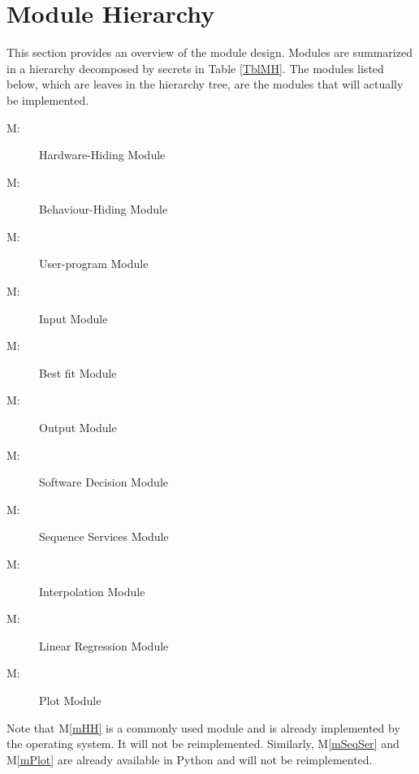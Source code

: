 \documentclass[12pt, titlepage]{article}
\newcounter{mnum}
\newcommand{\mthemnum}{M\themnum}
\newcommand{\mref}[1]{M\ref{#1}}
\begin{document}
\section{Module Hierarchy} \label{SecMH}

This section provides an overview of the module design. Modules are summarized
in a hierarchy decomposed by secrets in Table \ref{TblMH}. The modules listed
below, which are leaves in the hierarchy tree, are the modules that will
actually be implemented.

\begin{description}
\item [ \mthemnum \label{mHH}:] Hardware-Hiding Module
\item [ \mthemnum \label{mBH}:] Behaviour-Hiding Module
\item [ \mthemnum \label{mControl}:] User-program Module
\item [ \mthemnum \label{mInput}:] Input Module

\item [ \mthemnum \label{mBestFit}:] Best fit Module
\item [ \mthemnum \label{mOutput}:] Output Module
\item [ \mthemnum \label{mSD}:] Software Decision Module
\item [ \mthemnum \label{mSeqSer}:] Sequence Services Module 
\item [ \mthemnum \label{mInterp}:] Interpolation Module
\item [ \mthemnum \label{mLinearReg}:] Linear Regression Module
\item [ \mthemnum \label{mPlot}:] Plot Module
\end{description}

Note that \mref{mHH} is a commonly used module and is already implemented by the
operating system.  It will not be reimplemented.  Similarly, \mref{mSeqSer} and
\mref{mPlot} are already available in Python and will not be reimplemented.
\end{document}
